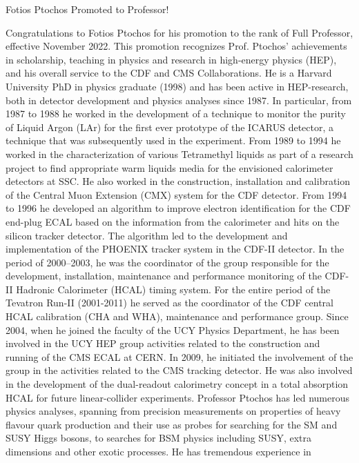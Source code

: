 \begin{headline}[enhanced, tikz={rotate=0}]{Fotios Ptochos Promoted to Professor!}
  \begin{multicols}{2}
 Congratulations to Fotios Ptochos for his promotion to the rank of
 Full Professor, effective November 2022. This promotion recognizes
 Prof. Ptochos' achievements in scholarship, teaching in physics and research in
 high-energy physics (HEP), and his overall service to the CDF and CMS
 Collaborations. He is a Harvard University PhD in physics
 graduate (1998) and has been active in HEP-research, both in detector
development and physics analyses since 1987. In particular, from 1987
to 1988 he worked in the development of a technique to monitor the
purity of Liquid Argon (LAr) for the first ever prototype of the
ICARUS detector, a technique that was subsequently used in the
experiment. From 1989 to 1994 he worked in the characterization of
various Tetramethyl liquids as part of a research project to find
appropriate warm liquids media for the envisioned calorimeter
detectors at SSC. He also worked in the construction, installation and
calibration of the Central Muon Extension (CMX) system for the CDF
detector. From 1994 to 1996 he developed an algorithm to improve
electron identification for the CDF end-plug ECAL based on the
information from the calorimeter and hits on the silicon tracker
detector. The algorithm led to the development and implementation of
the PHOENIX tracker system in the CDF-II detector. 
In the period of 2000–2003, he was the coordinator of the group
responsible for the development, installation, maintenance and
performance monitoring of the CDF-II Hadronic Calorimeter (HCAL)
timing system. For the entire period of the Tevatron Run-II
(2001-2011) he served as the coordinator of the CDF central HCAL
calibration (CHA and WHA), maintenance and performance group. Since
2004, when he joined the faculty of the UCY Physics Department, he has
been involved in the UCY HEP group activities related to the
construction and running of the CMS ECAL at CERN. In 2009, he
initiated the involvement of the group in the activities related to
the CMS tracking detector. He was also involved in the development of
the dual-readout calorimetry concept in a total absorption HCAL for
future linear-collider experiments. 
Professor Ptochos has led numerous physics analyses, spanning
from precision measurements on properties of heavy flavour quark
production and their use as probes for searching for the SM and SUSY
Higgs bosons, to searches for BSM physics including SUSY, extra
dimensions and other exotic processes. He has tremendous experience in

\end{multicols}
\end{headline}

